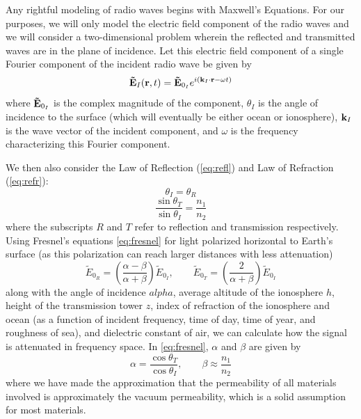\documentclass[11pt]{article}
\numberwithin{equation}{section}
\begin{document}
Any rightful modeling of radio waves begins with Maxwell's Equations. For our purposes, we will only model the electric field component of the radio waves and we will consider a two-dimensional problem wherein the reflected and transmitted waves are in the plane of incidence. Let this electric field component of a single Fourier component of the incident radio wave be given by
\begin{equation}
{\bf \tilde{E}}_{I}({\bf r}, t) = {\bf \tilde{E}}_{0_I} e^{i({\bf k}_{I} \cdot {\bf r} - \omega t)}
\end{equation}
where ${\bf \tilde{E}}_{0_I}$ is the complex magnitude of the component, $\theta_{I}$ is the angle of incidence to the surface (which will eventually be either ocean or ionosphere), ${\bf k}_{I}$ is the wave vector of the incident component, and $\omega$ is the frequency characterizing this Fourier component.
\par We then also consider the Law of Reflection (\ref{eq:refl}) and Law of Refraction (\ref{eq:refr}):
\begin{equation}
\theta_{I} = \theta_{R}
\label{eq:refl}
\end{equation}
\begin{equation}
\frac{\sin\theta_{T}}{\sin\theta_{I}} = \frac{n_1}{n_2}
\label{eq:refr}
\end{equation}
where the subscripts $R$ and $T$ refer to reflection and transmission respectively. Using Fresnel's equations \ref{eq:fresnel} for light polarized horizontal to Earth's surface (as this polarization can reach larger distances with less attenuation)
\begin{equation}
\tilde{E}_{0_R} = \left( \frac{\alpha - \beta}{\alpha + \beta} \right)\tilde{E}_{0_I}, \qquad 
\tilde{E}_{0_T} = \left( \frac{2}{\alpha + \beta} \right)\tilde{E}_{0_I}
\label{eq:fresnel}
\end{equation}
along with the angle of incidence $alpha$, average altitude of the ionosphere $h$, height of the transmission tower $z$, index of refraction of the ionosphere and ocean (as a function of incident frequency, time of day, time of year, and roughness of sea), and dielectric constant of air, we can calculate how the signal is attenuated in frequency space. In \ref{eq:fresnel}, $\alpha$ and $\beta$ are given by
\begin{equation}
\alpha = \frac{\cos\theta_{T}}{\cos\theta_{I}}, \qquad \beta \approx \frac{n_1}{n_2}
\end{equation}
where we have made the approximation that the permeability of all materials involved is approximately the vacuum permeability, which is a solid assumption for most materials.\cite{griffiths2005introduction} 
\end{document}
